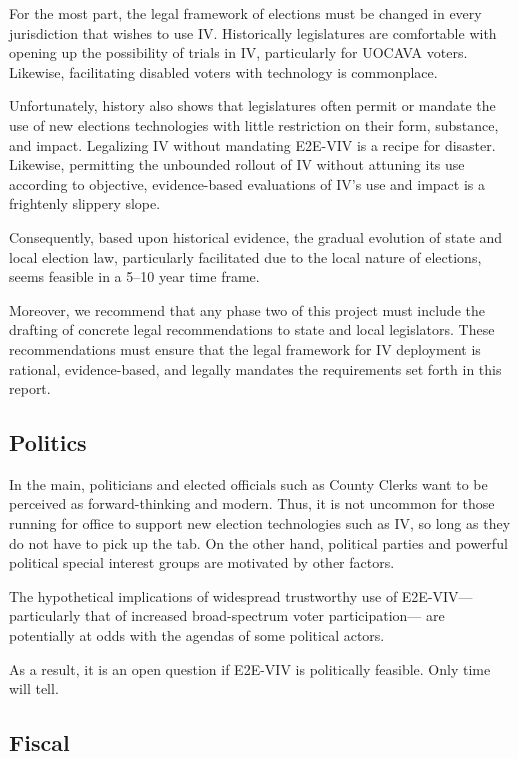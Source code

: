 For the most part, the legal framework of elections must be changed in
every jurisdiction that wishes to use IV.  Historically legislatures
are comfortable with opening up the possibility of trials in IV,
particularly for UOCAVA voters.  Likewise, facilitating disabled voters
with technology is commonplace.

Unfortunately, history also shows that legislatures often permit or
mandate the use of new elections technologies with little restriction
on their form, substance, and impact.  Legalizing IV without mandating
E2E-VIV is a recipe for disaster.  Likewise, permitting the unbounded
rollout of IV without attuning its use according to objective,
evidence-based evaluations of IV's use and impact is a frightenly
slippery slope.

Consequently, based upon historical evidence, the gradual evolution of
state and local election law, particularly facilitated due to the
local nature of elections, seems feasible in a 5--10 year time
frame. 

Moreover, we recommend that any phase two of this project must include
the drafting of concrete legal recommendations to state and local
legislators.  These recommendations must ensure that the legal
framework for IV deployment is rational, evidence-based, and legally
mandates the requirements set forth in this report.

\subsection{Politics}

In the main, politicians and elected officials such as County Clerks
want to be perceived as forward-thinking and modern.  Thus, it is not
uncommon for those running for office to support new election
technologies such as IV, so long as they do not have to pick up the
tab.  On the other hand, political parties and powerful political
special interest groups are motivated by other factors.

The hypothetical implications of widespread trustworthy use of
E2E-VIV---particularly that of increased broad-spectrum voter
participation--- are potentially at odds with the agendas of some
political actors.

As a result, it is an open question if E2E-VIV is politically
feasible.  Only time will tell.

\subsection{Fiscal}
\label{sec:fiscal}

